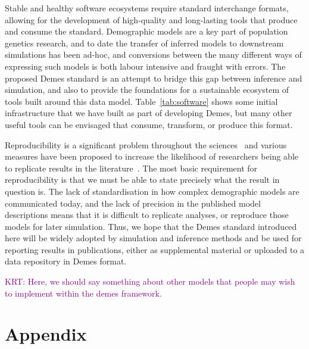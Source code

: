 \documentclass[11pt]{article}
\newcommand{\krtcomment}[1]{{\textcolor{purple}{KRT: #1}}}
\begin{document}
Stable and healthy software ecosystems require standard interchange
formats, allowing for the development of high-quality and long-lasting
tools that produce and consume the standard.
Demographic models are a key part of population genetics research,
and to date the transfer of inferred models to downstream simulations
has been ad-hoc, and conversions between the many different ways
of expressing such models is both labour intensive and fraught with errors.
The proposed Demes standard is an attempt to bridge this gap
between inference and simulation, and also to provide the foundations
for a sustainable ecosystem of tools built around this data model.
Table~\ref{tab:software} shows some initial infrastructure that we have
built as part of developing Demes, but many other useful tools
can be envisaged that consume, transform, or produce this format.

Reproducibility is a significant problem throughout the
sciences~\citep{baker20161} and various measures have been
proposed to increase the likelihood of researchers being
able to replicate results in the
literature~\citep{munafo2017manifesto}. The most basic requirement
for reproducibility is that we must be able to state precisely what
the result in question is. The lack of standardisation in how
complex demographic models are communicated today, and the lack of
precision in the published model descriptions means that it is difficult
to replicate analyses, or reproduce those models for later simulation.
Thus, we hope that the Demes standard introduced here will be widely adopted
by simulation and inference methods and be used for reporting results in
publications, either as supplemental material or uploaded to a data
repository in Demes format.

\krtcomment{Here, we should say something about other models that people may wish to implement within the demes
framework.}





\renewcommand{\thefigure}{A\arabic{figure}}
\renewcommand{\thetable}{A\arabic{table}}
\renewcommand{\theequation}{A\arabic{equation}}
\renewcommand{\thesection}{A\arabic{section}}
\setcounter{figure}{0}
\setcounter{table}{0}
\setcounter{equation}{0}

\section*{Appendix}
\end{document}
